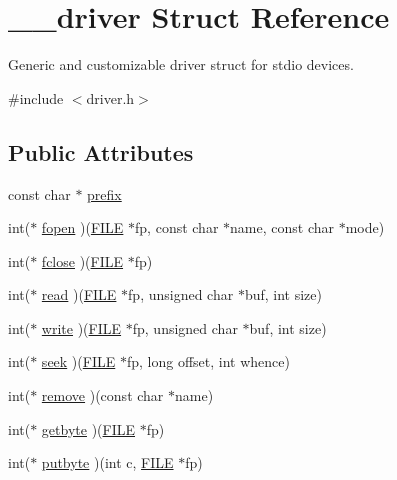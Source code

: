 \hypertarget{struct____driver}{}\section{\+\_\+\+\_\+driver Struct Reference}
\label{struct____driver}


Generic and customizable driver struct for stdio devices.  




{\ttfamily \#include $<$driver.\+h$>$}

\subsection*{Public Attributes}
\begin{DoxyCompactItemize}
\item 
const char $\ast$ \mbox{\hyperlink{struct____driver_ac71ee9154799b2e861d2eeb8a1d4187b}{prefix}}
\item 
int($\ast$ \mbox{\hyperlink{struct____driver_aff96f49764bd6d991e204f1e3cd0adfd}{fopen}} )(\mbox{\hyperlink{stdio_8h_a175abb747ea3b78aa8da87355dcec473}{F\+I\+LE}} $\ast$fp, const char $\ast$name, const char $\ast$mode)
\item 
int($\ast$ \mbox{\hyperlink{struct____driver_a31af02555db35d9f4f4f8c63614fee62}{fclose}} )(\mbox{\hyperlink{stdio_8h_a175abb747ea3b78aa8da87355dcec473}{F\+I\+LE}} $\ast$fp)
\item 
int($\ast$ \mbox{\hyperlink{struct____driver_ad0ae4ab69b55f0a0723b955e3bfca5fa}{read}} )(\mbox{\hyperlink{stdio_8h_a175abb747ea3b78aa8da87355dcec473}{F\+I\+LE}} $\ast$fp, unsigned char $\ast$buf, int size)
\item 
int($\ast$ \mbox{\hyperlink{struct____driver_a902b3520e511e35b74bcab898856031d}{write}} )(\mbox{\hyperlink{stdio_8h_a175abb747ea3b78aa8da87355dcec473}{F\+I\+LE}} $\ast$fp, unsigned char $\ast$buf, int size)
\item 
int($\ast$ \mbox{\hyperlink{struct____driver_ae5f6ef5127202521669991e7f16ae23f}{seek}} )(\mbox{\hyperlink{stdio_8h_a175abb747ea3b78aa8da87355dcec473}{F\+I\+LE}} $\ast$fp, long offset, int whence)
\item 
int($\ast$ \mbox{\hyperlink{struct____driver_a239638fb330ecc6377047de9b7f5d34a}{remove}} )(const char $\ast$name)
\item 
int($\ast$ \mbox{\hyperlink{struct____driver_a3c7a25bc3839094e0808f464bcea1ec8}{getbyte}} )(\mbox{\hyperlink{stdio_8h_a175abb747ea3b78aa8da87355dcec473}{F\+I\+LE}} $\ast$fp)
\item 
int($\ast$ \mbox{\hyperlink{struct____driver_aa5d9cb7bcaa7b8d06d68c3da1c81160e}{putbyte}} )(int c, \mbox{\hyperlink{stdio_8h_a175abb747ea3b78aa8da87355dcec473}{F\+I\+LE}} $\ast$fp)
\end{DoxyCompactItemize}


